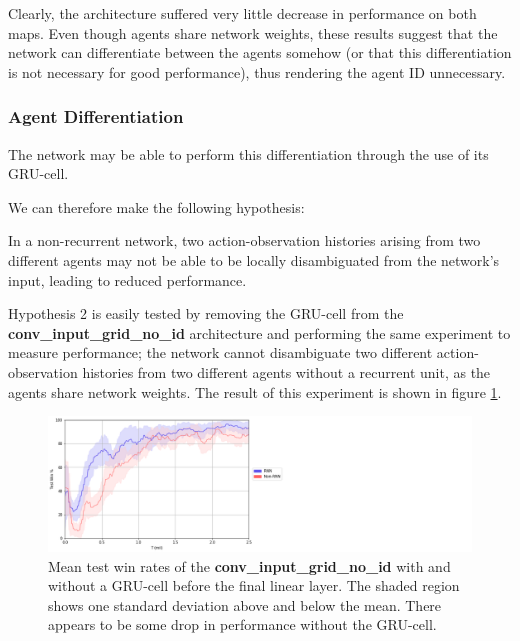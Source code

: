 Clearly, the architecture suffered very little decrease in performance on both maps. Even though agents share network weights, these results suggest that the network can differentiate between the agents somehow (or that this differentiation is not necessary for good performance), thus rendering the agent ID unnecessary. 


\subsubsection{Agent Differentiation}

The network may be able to perform this differentiation through the use of its GRU-cell.

We can therefore make the following hypothesis:

\begin{hyp} \label{hyp:second}
In a non-recurrent network, two action-observation histories arising from two different agents may not be able to be locally disambiguated from the network's input, leading to reduced performance.
\end{hyp}


Hypothesis 2 is easily tested by removing the GRU-cell from the \textbf{conv\_input\_grid\_no\_id} architecture and performing the same experiment to measure performance; the network cannot disambiguate two different action-observation histories from two different agents without a recurrent unit, as the agents share network weights. The result of this experiment is shown in figure \ref{fig:RNNvsnonRNN}.

\begin{figure}
    \centering
    \hbox{\hspace{5em}\includegraphics[scale=0.5]{images/graphs/RNN.png}}
    \caption{Mean test win rates of the \textbf{conv\_input\_grid\_no\_id} with and without a GRU-cell before the final linear layer. The shaded region shows one standard deviation above and below the mean. There appears to be some drop in performance without the GRU-cell.}
    \label{fig:RNNvsnonRNN}
\end{figure}


